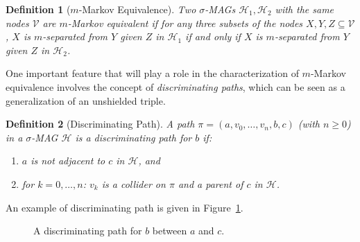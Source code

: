 \documentclass[accepted]{uai2025} %
\newtheorem{definition}{Definition}
\begin{document}
\begin{definition} [$m$-Markov Equivalence]
Two $\sigma$-MAGs $\mathcal{H}_1,\mathcal{H}_2$ with the same nodes $\mathcal{V}$ are \emph{$m$-Markov equivalent} if for any three subsets of the nodes $X,Y,Z\subseteq \mathcal{V}$, $X$ is $m$-separated from $Y$ given $Z$ in $\mathcal{H}_1$ if and only if $X$ is $m$-separated from $Y$ given $Z$ in $\mathcal{H}_2$.
\end{definition}

One important feature that will play a role in the characterization of $m$-Markov equivalence involves the concept of \emph{discriminating paths}, which can be seen as a generalization of an unshielded triple.

\begin{definition} [Discriminating Path]
A path $\pi=(a,v_0,\ldots,v_n,b,c)$ (with $n\geq0$) in a $\sigma$-MAG $\mathcal{H}$ is a \emph{discriminating path} for $b$ if:
\begin{enumerate}
    \item $a$ is not adjacent to $c$ in $\mathcal{H}$, and
    \item for $k=0,\ldots,n$: $v_k$ is a collider on $\pi$ and a parent of $c$ in $\mathcal{H}$.
\end{enumerate}
\end{definition}

An example of discriminating path is given in Figure~\ref{fig:discriminating_path}.

\begin{figure}[t]
\centering
  \caption{A discriminating path for $b$ between $a$ and $c$.\label{fig:discriminating_path}}
\end{figure}
\end{document}
